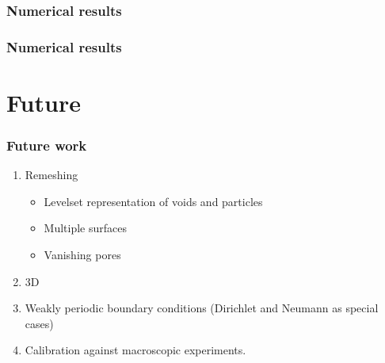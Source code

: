 \documentclass[11pt,mathserif]{beamer}
\begin{document}
\begin{frame}
 \frametitle{Numerical results}
\begin{center}

\end{center}
\end{frame}

\begin{frame}
 \frametitle{Numerical results}
\begin{center}

\end{center}
\end{frame}


\section{Future}
\begin{frame}
 \frametitle{Future work}

 \begin{enumerate}
  \item Remeshing
  \begin{itemize}
   \item Levelset representation of voids and particles
   \item Multiple surfaces
   \item Vanishing pores
  \end{itemize}
  \item 3D
  \item Weakly periodic boundary conditions (Dirichlet and Neumann as special cases)
  \item Calibration against macroscopic experiments.
 \end{enumerate}

\end{frame}
\end{document}
